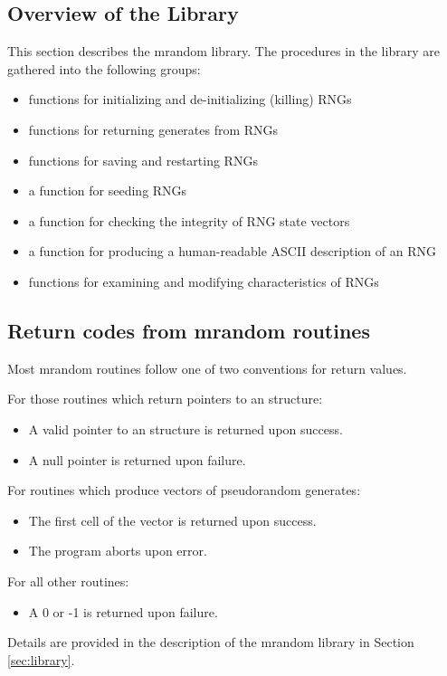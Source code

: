 \subsection{Overview of the Library}
This section describes the mrandom library.  The procedures
in the library are gathered into the following groups:
\begin{itemize}
\item functions for initializing and de-initializing (killing)
RNGs
\item functions for returning generates from RNGs
\item functions for saving and restarting RNGs
\item a function for seeding RNGs
\item a function for checking the integrity of RNG state vectors
\item a function for producing a human-readable ASCII description
of an RNG
\item functions for examining and modifying characteristics of RNGs
\end{itemize}

\subsection{Return codes from mrandom routines}
Most mrandom routines follow one of two conventions for return
values.

\noindent
For those routines which return pointers to an 
structure:
\begin{itemize}
\item A valid pointer to an  structure is returned upon
success.
\item A null pointer is returned upon failure.
\end{itemize}
For routines which produce vectors of pseudorandom generates:
\begin{itemize}
\item The first cell of the vector is returned upon success.
\item The program aborts upon error.
\end{itemize}
For all other routines:
\begin{itemize}
\item A 0 or -1 is returned upon failure.
\end{itemize}
Details are provided in the description of the mrandom library
in Section \ref{sec:library}.

